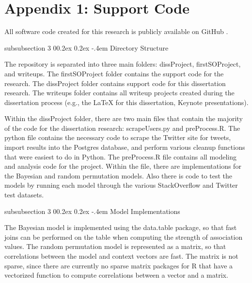 \documentclass[man,floatsintext,donotrepeattitle]{apa6}
\makeatletter
\renewcommand{\subsubsection}{%
  \@startsection
  {subsubsection}%
  {3}%
  {\parindent}%
  {0\baselineskip \@plus 0.2ex \@minus 0.2ex}%
  {-.4em}%
  {\normalfont\normalsize\bfseries\addperi}}
\makeatother
\begin{document}
\begingroup
{}
\setlength\bibitemsep{12pt}
\clearpage
\printbibliography[heading=bibintoc]
\endgroup

\clearpage
\section{Appendix 1: Support Code}

All software code created for this research is publicly available on GitHub \parencite{StanleyRepo2014}.

\subsubsection{Directory Structure}

The repository is separated into three main folders:
dissProject, firstSOProject, and writeups.
The firstSOProject folder contains the support code for the \textcite{Stanley2013} research.
The dissProject folder contains support code for this dissertation research.
The writeups folder contains all writeup projects created during the dissertation process (e.g., the LaTeX for this dissertation, Keynote presentations).

Within the dissProject folder, there are two main files that contain the majority of the code for the dissertation research: scrapeUsers.py and preProcess.R.
The python file contains the necessary code to scrape the Twitter site for tweets, import results into the Postgres database, and perform various cleanup functions that were easiest to do in Python.
The preProcess.R file contains all modeling and analysis code for the project.
Within the file, there are implementations for the Bayesian and random permutation models.
Also there is code to test the models by running each model through the various StackOverflow and Twitter test datasets.

\subsubsection{Model Implementations}

The Bayesian model is implemented using the data.table package, so that fast joins can be performed on the table when computing the strength of association values.
The random permutation model is represented as a matrix, so that correlations between the model and context vectors are fast.
The matrix is not sparse, since there are currently no sparse matrix packages for R that have a vectorized function to compute correlations between a vector and a matrix.
\end{document}
